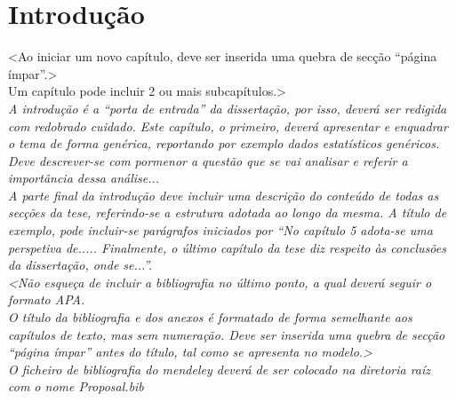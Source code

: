 \chapter{Introdução}
\noindent<Ao iniciar um novo capítulo, deve ser inserida uma quebra de secção “página ímpar”.>\\
Um capítulo pode incluir 2 ou mais subcapítulos.>\\
\noindent\textit{A introdução é a “porta de entrada” da dissertação, por isso, deverá ser redigida com redobrado cuidado. Este capítulo, o primeiro, deverá apresentar e enquadrar o tema de forma genérica, reportando por exemplo dados estatísticos genéricos. Deve descrever-se com pormenor a questão que se vai analisar e referir a importância dessa análise...\\
A parte final da introdução deve incluir uma descrição do conteúdo de todas as secções da tese, referindo-se a estrutura adotada ao longo da mesma. A título de exemplo, pode incluir-se parágrafos iniciados por “No capítulo 5 adota-se uma perspetiva de..... Finalmente, o último capítulo da tese diz respeito às conclusões da dissertação, onde se...”\cite{Inform}.\\
}
\textit{<Não esqueça de incluir a bibliografia no último ponto, a qual deverá seguir o formato APA.}\\
\textit{O título da bibliografia e dos anexos é formatado de forma semelhante aos capítulos de texto, mas sem numeração. Deve ser inserida uma quebra de secção “página ímpar” antes do título, tal como se apresenta no modelo.>}\\
\textit{O ficheiro de bibliografia do mendeley deverá de ser colocado na diretoria raíz com o nome Proposal.bib}
